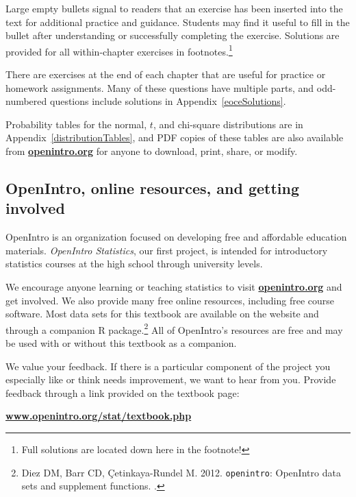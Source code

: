 \begin{exercise}
Large empty bullets signal to readers that an exercise has been inserted into the text for additional practice and guidance. Students may find it useful to fill in the bullet after understanding or successfully completing the exercise. Solutions are provided for all within-chapter exercises in footnotes.\footnote{Full solutions are located down here in the footnote!}
\end{exercise}

There are exercises at the end of each chapter that are useful for practice or homework assignments. Many of these questions have multiple parts, and odd-numbered questions include solutions in Appendix~\ref{eoceSolutions}.

Probability tables for the normal, $t$, and chi-square distributions are in Appendix~\ref{distributionTables}, and PDF copies of these tables are also available from \href{http://www.openintro.org}{\color{black}\textbf{openintro.org}} for anyone to download, print, share, or modify.


\subsection*{OpenIntro, online resources, and getting involved}

OpenIntro is an organization focused on developing free and affordable education materials. \emph{OpenIntro Statistics}, our first project, is intended for introductory statistics courses at the high school through university levels.

We encourage anyone learning or teaching statistics to visit \href{http://www.openintro.org}{\color{black}\textbf{openintro.org}} and get involved. We also provide many free online resources, including free course software. Most data sets for this textbook are available on the website and through a companion R package.\footnote{Diez DM, Barr CD, \c{C}etinkaya-Rundel M. 2012. \texttt{openintro}: OpenIntro data sets and supplement functions. .} All of OpenIntro's resources are free and may be used with or without this textbook as a companion.

We value your feedback. If there is a particular component of the project you especially like or think needs improvement, we want to hear from you. Provide feedback through a link provided on the textbook page:
\begin{center}
\href{http://www.openintro.org/stat/textbook.php}{\color{black}\textbf{www.openintro.org/stat/textbook.php}}
\end{center}


